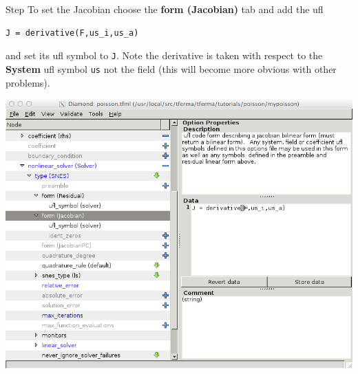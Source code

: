 \begin{steps}{Step}
To set the Jacobian choose  the \textbf{form (Jacobian)} tab and add
the ufl
\begin{lstlisting}[style=ufl]
J = derivative(F,us_i,us_a)
\end{lstlisting}
and set its ufl symbol to \texttt{J}.  Note the derivative is taken
with respect to the \textbf{System} ufl symbol \texttt{us} not the
field (this will become more obvious with other problems).
\begin{center}
    \includegraphics[width=\diamondwidth]{figures/screendumps/diamond_poisson_11d.png}
\end{center}


\end{steps}
